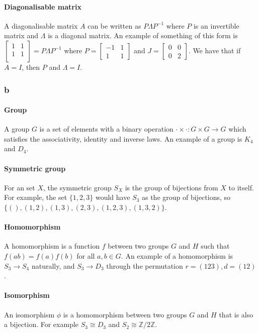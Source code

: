 \documentclass[]{article}
\begin{document}
\paragraph{Diagonalisable matrix} A diagonalisable matrix $A$ can be written as $P \Lambda P^{-1}$ where $P$ is an invertible matrix and $\Lambda$ is a diagonal matrix. An example of something of this form is
$
\begin{bmatrix}
	1 & 1 \\
	1 & 1 \\
\end{bmatrix}
= P\Lambda P^{-1}
$
where $P = 
\begin{bmatrix}
	-1& 1\\
	1 & 1 
\end{bmatrix}
$
and $J = \begin{bmatrix}
	0 & 0 \\
	0 & 2
\end{bmatrix}
$.
We have that if $A = I$, then $P$ and $\Lambda = I$. 
\subsubsection*{b}
\paragraph{Group}
A group $G$ is a set of elements with a binary operation $ \cdot \times \cdot : G \times G \rightarrow G$ which satisfies the associativity, identity and inverse laws. An example of a group is $K_4$ and $D_4$.
\paragraph{Symmetric group} For an set $X$, the symmetric group $S_X$ is the group of bijections from $X$ to itself. For example, the set $\lbrace 1, 2, 3\rbrace$ would have $S_3$ as the group of bijections, so $\lbrace (), (1, 2), (1, 3), (2, 3), (1,2,3), (1, 3, 2) \rbrace$. 
\paragraph{Homomorphism} A homomorphism is a function $f$ between two groups $G$ and $H$ such that $f(ab) = f(a) f(b)$ for all $a, b \in G$.  An example of a homomorphism is $S_3 \rightarrow S_4$ naturally, and $S_3 \rightarrow D_3$ through the permutation $r = (123), d = (12)$. 
\paragraph{Isomorphism} An isomorphism $\phi$ is a homomorphism between two groups $G$ and $H$ that is also a bijection. For example $S_3 \cong D_3$ and $S_2 \cong \mathbb{Z}/2 \mathbb{Z}$. 
\end{document}
